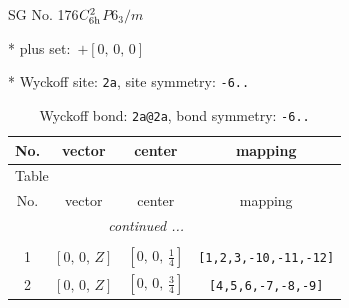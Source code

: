 \documentclass[fleqn,8pt]{jsarticle}
\begin{document}
\setcounter{MaxMatrixCols}{32}

\renewcommand{\tablename}{Table~}
\renewcommand{\figurename}{Figure~}
\begin{center}
\LARGE
SG No. 176\quad$C_{\rm 6h}^{2}$\quad$P6_3/m$\quad[ hexagonal ]
\end{center}

* plus set:\,\,\,$+\left[ 0,\, 0,\, 0 \right]$


* Wyckoff site: {\tt 2a}, site symmetry: {\tt -6..}
\renewcommand{\arraystretch}{1.2}
\begin{longtable}{cccc}
\caption{Wyckoff bond: {\tt 2a@2a}, bond symmetry: {\tt -6..}}
 \\
 \hline \hline
No. & vector & center & mapping \\ \hline \endfirsthead

\multicolumn{3}{l}{\tablename\ \thetable{}} \\
 \hline \hline
No. & vector & center & mapping \\ \hline \endhead

 \hline \hline
\multicolumn{3}{r}{\footnotesize\it continued ...} \\ \endfoot

 \hline \hline
\multicolumn{3}{r}{} \\ \endlastfoot

1 & $\left[ 0,\, 0,\, Z \right]$ & $\left[ 0,\, 0,\, \frac{1}{4} \right]$ & {\tt [1,2,3,-10,-11,-12]} \\ \hline
2 & $\left[ 0,\, 0,\, Z \right]$ & $\left[ 0,\, 0,\, \frac{3}{4} \right]$ & {\tt [4,5,6,-7,-8,-9]} \\
\end{longtable}
\renewcommand{\arraystretch}{1.2}
\end{document}
